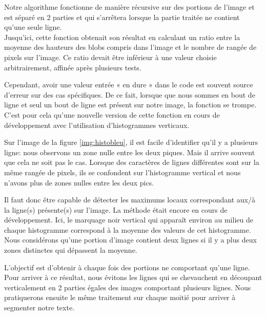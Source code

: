 \documentclass[12pt,a4paper]{article}
\begin{document}
Notre algorithme fonctionne de manière récursive sur des portions de l'image et est séparé en 2 parties et qui s'arrêtera lorsque la partie traitée ne contient qu'une seule ligne.\\
Jusqu’ici, cette fonction obtenait son résultat en calculant un ratio entre la moyenne des hauteurs des blobs compris dans l’image et le nombre de rangée de pixels sur l’image. Ce ratio devait être inférieur à une valeur choisie arbitrairement, affinée après plusieurs tests.\bigbreak

Cependant, avoir une valeur entrée « en dure » dans le code est souvent source d’erreur sur des cas spécifiques. De ce fait, lorsque que nous sommes en bout de ligne et seul un bout de ligne est présent sur notre image, la fonction se trompe.\bigbreak
C’est pour cela qu’une nouvelle version de cette fonction en cours de développement avec l’utilisation d’histogrammes verticaux. 



Sur l'image de la figure \ref{img:histobleu}, il est facile d'identifier qu'il y a plusieurs ligne: nous observons un zone nulle entre les deux piques. Mais il arrive souvent que cela ne soit pas le cas. Lorsque des caractères de lignes différentes sont sur la même rangée de pixels, ils se confondent sur l'histogramme vertical et nous n'avons plus de zones nulles entre les deux pics.\bigbreak



Il faut donc être capable de détecter les maximums locaux correspondant aux/à la ligne(s) présente(s) sur l’image. La méthode était encore en cours de développement. Ici, le marquage noir vertical qui apparaît environ au milieu de chaque histogramme correspond à la moyenne des valeurs de cet histogramme. Nous considérons qu'une portion d'image contient deux lignes si il y a plus deux zones distinctes qui dépassent la moyenne.\bigbreak
	
L'objectif est d'obtenir à chaque fois des portions ne comportant qu'une ligne.\\
Pour arriver à ce résultat, nous évitons les lignes qui se chevauchent en découpant verticalement en 2 parties égales des images comportant plusieurs lignes. Nous pratiquerons ensuite le même traitement sur chaque moitié pour arriver à segmenter notre texte.\bigbreak
\end{document}
